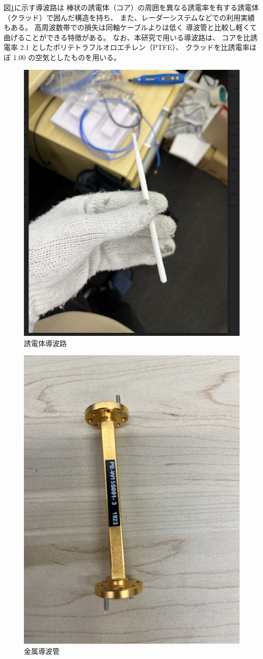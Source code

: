 \documentclass[technicalreport]{ieicej}
\begin{document}
図\ref{fig:dielectric_waveguide}に示す導波路は
棒状の誘電体（コア）の周囲を異なる誘電率を有する誘電体（クラッド）で囲んだ構造を持ち、
また、レーダーシステム\cite{4297420}などでの利用実績もある。
高周波数帯での損失は同軸ケーブルよりは低く
導波管と比較し軽くて曲げることができる特徴がある。
なお、本研究で用いる導波路は、
コアを比誘電率 2.1 としたポリテトラフルオロエチレン（PTFE）、
クラッドを比誘電率ほぼ 1.00 の空気としたものを用いる。

\begin{figure}[tb]
  \begin{center}
    \includegraphics[bb=0 0 311 384, width=0.5\linewidth]{img/waveguide.pdf}
    \caption{誘電体導波路}
    \label{fig:dielectric_waveguide}
  \end{center}
\end{figure}

\begin{figure}[tb]
  \begin{center}
    \includegraphics[bb=0.000000 0.000000 593.264305 791.019074, width=0.5\linewidth]{img/metallic_waveguide.pdf}
    \caption{金属導波管}
    \label{fig:metallic_waveguide}
  \end{center}
\end{figure}
\end{document}
